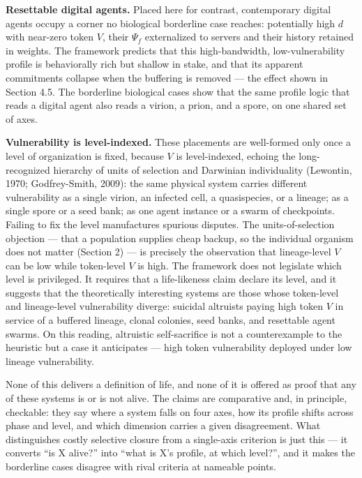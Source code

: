 \documentclass[Afour,sageh,times,doublespace]{sagej}
\begin{document}
\textbf{Resettable digital agents.} Placed here for contrast, contemporary digital agents occupy a corner no biological borderline case reaches: potentially high \(d\) with near-zero token \(V\), their \(\Psi_f\) externalized to servers and their history retained in weights. The framework predicts that this high-bandwidth, low-vulnerability profile is behaviorally rich but shallow in stake, and that its apparent commitments collapse when the buffering is removed --- the effect shown in Section 4.5. The borderline biological cases show that the same profile logic that reads a digital agent also reads a virion, a prion, and a spore, on one shared set of axes.

\textbf{Vulnerability is level-indexed.} These placements are well-formed only once a level of organization is fixed, because \(V\) is level-indexed, echoing the long-recognized hierarchy of units of selection and Darwinian individuality (Lewontin, 1970; Godfrey-Smith, 2009): the same physical system carries different vulnerability as a single virion, an infected cell, a quasispecies, or a lineage; as a single spore or a seed bank; as one agent instance or a swarm of checkpoints. Failing to fix the level manufactures spurious disputes. The units-of-selection objection --- that a population supplies cheap backup, so the individual organism does not matter (Section 2) --- is precisely the observation that lineage-level \(V\) can be low while token-level \(V\) is high. The framework does not legislate which level is privileged. It requires that a life-likeness claim declare its level, and it suggests that the theoretically interesting systems are those whose token-level and lineage-level vulnerability diverge: suicidal altruists paying high token \(V\) in service of a buffered lineage, clonal colonies, seed banks, and resettable agent swarms. On this reading, altruistic self-sacrifice is not a counterexample to the heuristic but a case it anticipates --- high token vulnerability deployed under low lineage vulnerability.

None of this delivers a definition of life, and none of it is offered as proof that any of these systems is or is not alive. The claims are comparative and, in principle, checkable: they say where a system falls on four axes, how its profile shifts across phase and level, and which dimension carries a given disagreement. What distinguishes costly selective closure from a single-axis criterion is just this --- it converts ``is X alive?'' into ``what is X's profile, at which level?'', and it makes the borderline cases disagree with rival criteria at nameable points.
\end{document}

